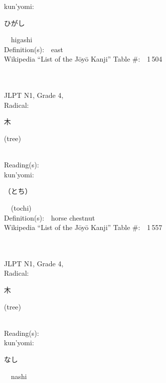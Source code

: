 \begin{multicols}{2}
{\hspace*{1em}}kun'yomi:\ \ \\
{\hspace*{2em}}{\begin{CJK}{UTF8}{min} ひがし \end{CJK}}\ \ higashi\ \ \\
Definition(s):\ \ east \\
Wikipedia ``List of the J\=oy\=o Kanji'' Table \#:\ \ 1\,504 \\
\ \ \\
{\fontsize{34pt}{40pt}  }\ \ \\  %
{JLPT N1, Grade 4, \\Radical:\ \ {\begin{CJK}{UTF8}{min} 木 \end{CJK}} (tree) } \\
Reading(s):\ \ \\
{\hspace*{1em}}kun'yomi:\ \ \\
{\hspace*{2em}}{\begin{CJK}{UTF8}{min} （とち） \end{CJK}}\ \ (tochi)\ \ \\
Definition(s):\ \ horse chestnut \\
Wikipedia ``List of the J\=oy\=o Kanji'' Table \#:\ \ 1\,557 \\
\ \ \\
{\fontsize{34pt}{40pt}  }\ \ \\  %
{JLPT N1, Grade 4, \\Radical:\ \ {\begin{CJK}{UTF8}{min} 木 \end{CJK}} (tree) } \\
Reading(s):\ \ \\
{\hspace*{1em}}kun'yomi:\ \ \\
{\hspace*{2em}}{\begin{CJK}{UTF8}{min} なし \end{CJK}}\ \ nashi\ \ \\

\end{multicols}
